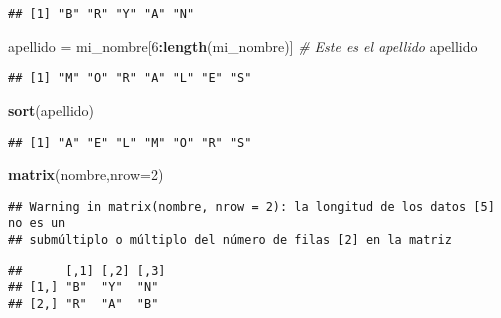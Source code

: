 \documentclass[
]{article}
\newenvironment{Shaded}{\begin{snugshade}}{\end{snugshade}}
\newcommand{\CommentTok}[1]{\textcolor[rgb]{0.56,0.35,0.01}{\textit{#1}}}
\newcommand{\DataTypeTok}[1]{\textcolor[rgb]{0.13,0.29,0.53}{#1}}
\newcommand{\DecValTok}[1]{\textcolor[rgb]{0.00,0.00,0.81}{#1}}
\newcommand{\KeywordTok}[1]{\textcolor[rgb]{0.13,0.29,0.53}{\textbf{#1}}}
\newcommand{\NormalTok}[1]{#1}
\newcommand{\OperatorTok}[1]{\textcolor[rgb]{0.81,0.36,0.00}{\textbf{#1}}}
\newcommand{\StringTok}[1]{\textcolor[rgb]{0.31,0.60,0.02}{#1}}
\begin{document}
\begin{verbatim}
## [1] "B" "R" "Y" "A" "N"
\end{verbatim}

\begin{Shaded}
\begin{Highlighting}[]
\NormalTok{apellido =}\StringTok{ }\NormalTok{mi_nombre[}\DecValTok{6}\OperatorTok{:}\KeywordTok{length}\NormalTok{(mi_nombre)] }\CommentTok{# Este es el apellido}
\NormalTok{apellido}
\end{Highlighting}
\end{Shaded}

\begin{verbatim}
## [1] "M" "O" "R" "A" "L" "E" "S"
\end{verbatim}

\begin{Shaded}
\begin{Highlighting}[]
\KeywordTok{sort}\NormalTok{(apellido)}
\end{Highlighting}
\end{Shaded}

\begin{verbatim}
## [1] "A" "E" "L" "M" "O" "R" "S"
\end{verbatim}

\begin{Shaded}
\begin{Highlighting}[]
\KeywordTok{matrix}\NormalTok{(nombre,}\DataTypeTok{nrow=}\DecValTok{2}\NormalTok{)}
\end{Highlighting}
\end{Shaded}

\begin{verbatim}
## Warning in matrix(nombre, nrow = 2): la longitud de los datos [5] no es un
## submúltiplo o múltiplo del número de filas [2] en la matriz
\end{verbatim}

\begin{verbatim}
##      [,1] [,2] [,3]
## [1,] "B"  "Y"  "N" 
## [2,] "R"  "A"  "B"
\end{verbatim}
\end{document}
